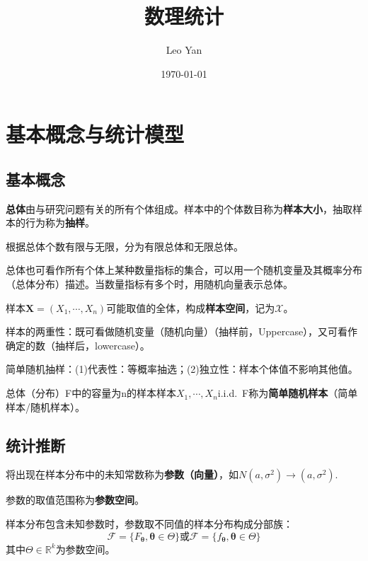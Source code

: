 \documentclass{ctexbook}
\title{数理统计}
\author{Leo Yan}
\date{\today}
\begin{document}
\maketitle
\tableofcontents
\clearpage
\chapter{基本概念与统计模型}

\section{基本概念}

\begin{definition}
    \textbf{总体}由与研究问题有关的所有个体组成。样本中的个体数目称为\textbf{样本大小}，抽取样本的行为称为\textbf{抽样}。

    根据总体个数有限与无限，分为有限总体和无限总体。
\end{definition}

总体也可看作所有个体上某种数量指标的集合，可以用一个随机变量及其概率分布（总体分布）描述。当数量指标有多个时，用随机向量表示总体。

\begin{definition}
    样本$\mathbf{X}=(X_1,\cdots,X_n)$可能取值的全体，构成\textbf{样本空间}，记为$\mathcal{X}$。
\end{definition}

样本的两重性：既可看做随机变量（随机向量）（抽样前，Uppercase），又可看作确定的数（抽样后，lowercase）。

简单随机抽样：(1)代表性：等概率抽选；(2)独立性：样本个体值不影响其他值。

\begin{definition}[简单随机样本]
    总体（分布）F中的容量为n的样本样本$X_1,\cdots,X_n$i.i.d.~F称为\textbf{简单随机样本}（简单样本/随机样本）。
\end{definition}

\section{统计推断}

\begin{definition}
    将出现在样本分布中的未知常数称为\textbf{参数（向量）}，如$N(a,\sigma^2)\to (a,\sigma^2)$.

    参数的取值范围称为\textbf{参数空间}。
\end{definition}

\begin{definition}
    样本分布包含未知参数时，参数取不同值的样本分布构成分部族：
    $$\mathcal{F} =\{F_{\boldsymbol{\theta}},\boldsymbol{\theta}\in\Theta\}\text{或}\mathcal{F} =\{f_{\boldsymbol{\theta}},\boldsymbol{\theta}\in\Theta\}$$
    其中$\Theta\in\mathbb{R}^k$为参数空间。
\end{definition}
\end{document}
